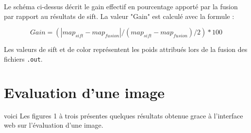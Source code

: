 \documentclass[a4paper, 11pt]{article}
\begin{document}
Le schéma ci-dessus décrit le gain effectif en pourcentage apporté par la fusion par rapport au résultats de sift. La valeur "Gain" est calculé avec la formule :

\begin{equation}
  Gain = (| map_{sift} - map_{fusion} | / (map_{sift} - map_{fusion}) / 2) * 100
\end{equation}

Les valeurs de sift et de color représentent les poids attribués lors de la fusion des fichiers \texttt{.out}.

\section{Evaluation d'une image}

voici Les figures 1  à trois présentes quelques résultats obtenue grace à l'interface web sur l'évaluation d'une image.
\begin{figure}[!ht]%
    \centering
    \qquad
    \caption{}%
    \label{fig:example}%
\end{figure}
\end{document}
